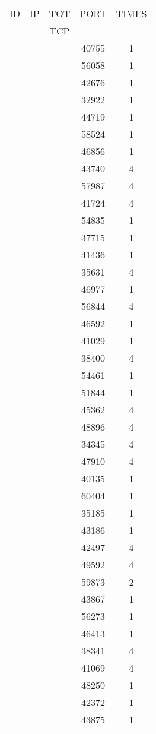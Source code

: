 \documentclass[a4paper]{scrartcl}
\begin{document}
\begin{minipage}[b]{0.5\linewidth}
\begin{tabular}{| c | c | c | c | c |}
\hline
ID & IP & TOT & PORT & TIMES \\ 
   &    & TCP &      &       \\ 
\hline
& & & 40755 & 1 \\ & & & 56058 & 1 \\ & & & 42676 & 1 \\ & & & 32922 & 1 \\ & & & 44719 & 1 \\ & & & 58524 & 1 \\ & & & 46856 & 1 \\ & & & 43740 & 4 \\ & & & 57987 & 4 \\ & & & 41724 & 4 \\ & & & 54835 & 1 \\ & & & 37715 & 1 \\ & & & 41436 & 1 \\ & & & 35631 & 4 \\ & & & 46977 & 1 \\ & & & 56844 & 4 \\ & & & 46592 & 1 \\ & & & 41029 & 1 \\ & & & 38400 & 4 \\ & & & 54461 & 1 \\ & & & 51844 & 1 \\ & & & 45362 & 4 \\ & & & 48896 & 4 \\ & & & 34345 & 4 \\ & & & 47910 & 4 \\ & & & 40135 & 1 \\ & & & 60404 & 1 \\ & & & 35185 & 1 \\ & & & 43186 & 1 \\ & & & 42497 & 4 \\ & & & 49592 & 4 \\ & & & 59873 & 2 \\ & & & 43867 & 1 \\ & & & 56273 & 1 \\ & & & 46413 & 1 \\ & & & 38341 & 4 \\ & & & 41069 & 4 \\ & & & 48250 & 1 \\ & & & 42372 & 1 \\ & & & 43875 & 1 \\ \hline\end{tabular}\end{minipage} \hfill\begin{minipage}[b]{0.5\linewidth}\begin{tabular}{| c | c | c | c | c |}

\end{tabular}
\end{minipage}
\end{document}
